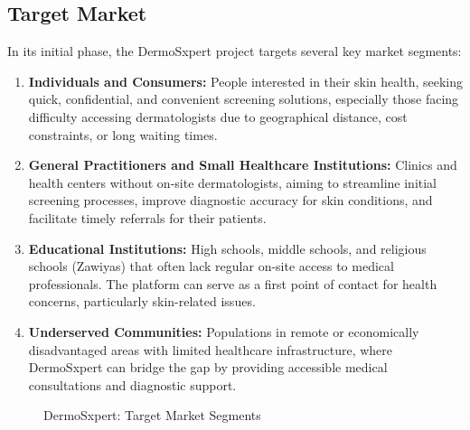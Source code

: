 \subsection{Target Market}
In its initial phase, the DermoSxpert project targets several key market segments:
\begin{enumerate}
  \item \textbf{Individuals and Consumers:} People interested in their skin health, seeking quick, confidential, and convenient screening solutions, especially those facing difficulty accessing dermatologists due to geographical distance, cost constraints, or long waiting times.
  \item \textbf{General Practitioners and Small Healthcare Institutions:} Clinics and health centers without on-site dermatologists, aiming to streamline initial screening processes, improve diagnostic accuracy for skin conditions, and facilitate timely referrals for their patients.
  \item  \textbf{Educational Institutions:} High schools, middle schools, and religious schools (Zawiyas) that often lack regular on-site access to medical professionals. The platform can serve as a first point of contact for health concerns, particularly skin-related issues.
  \item \textbf{Underserved Communities:} Populations in remote or economically disadvantaged areas with limited healthcare infrastructure, where DermoSxpert can bridge the gap by providing accessible medical consultations and diagnostic support.
\end{enumerate}

\begin{figure}[H]
    \centering
    \caption{DermoSxpert: Target Market Segments}
    \label{fig:target_market}
\end{figure}

